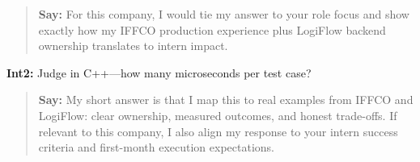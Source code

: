 \documentclass[9pt,a4paper]{article}
\begin{document}
\begin{quote}\small\textbf{Say:} For this company, I would tie my answer to your role focus and show exactly how my IFFCO production experience plus LogiFlow backend ownership translates to intern impact.\end{quote}
\vspace{2mm}
\textbf{Int2:} Judge in C++---how many microseconds per test case?

\begin{quote}\small\textbf{Say:} My short answer is that I map this to real examples from IFFCO and LogiFlow: clear ownership, measured outcomes, and honest trade-offs. If relevant to this company, I also align my response to your intern success criteria and first-month execution expectations.\end{quote}
\vspace{2mm}
\end{document}
